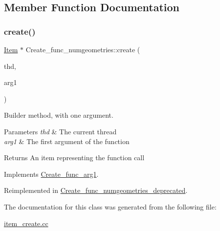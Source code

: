 \subsection{Member Function Documentation}
\mbox{\label{classCreate__func__numgeometries_a7271abfd27ec21a68910e66b908d3412}} 
\subsubsection{\texorpdfstring{create()}{create()}}
{\footnotesize\ttfamily \mbox{\hyperlink{classItem}{Item}} $\ast$ Create\+\_\+func\+\_\+numgeometries\+::create (\begin{DoxyParamCaption}\item[{T\+HD $\ast$}]{thd,  }\item[{\mbox{\hyperlink{classItem}{Item}} $\ast$}]{arg1 }\end{DoxyParamCaption})\hspace{0.3cm}{\ttfamily [virtual]}}

Builder method, with one argument. 
\begin{DoxyParams}{Parameters}
{\em thd} & The current thread \\
\hline
{\em arg1} & The first argument of the function \\
\hline
\end{DoxyParams}
\begin{DoxyReturn}{Returns}
An item representing the function call 
\end{DoxyReturn}


Implements \mbox{\hyperlink{classCreate__func__arg1_a3e9a98f755cd82c3e762e334c955a8c9}{Create\+\_\+func\+\_\+arg1}}.



Reimplemented in \mbox{\hyperlink{classCreate__func__numgeometries__deprecated_aeb6f235f1d620a8b4188aacfc513c860}{Create\+\_\+func\+\_\+numgeometries\+\_\+deprecated}}.



The documentation for this class was generated from the following file\+:\begin{DoxyCompactItemize}
\item 
\mbox{\hyperlink{item__create_8cc}{item\+\_\+create.\+cc}}\end{DoxyCompactItemize}
